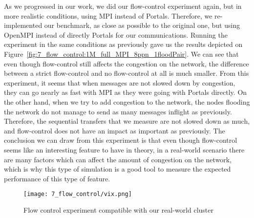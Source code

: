 As we progressed in our work, we did our flow-control experiment again, but in
more realistic conditions, using MPI instead of Portals. Therefore, we
re-implemented our benchmark, as close as possible to the original one, but
using OpenMPI instead of directly Portals for our communications. Running the
experiment in the same conditions as previously gave us the results depicted on
Figure~\ref{fig:7_flow_control:1M_full_MPI_8ppn_1floodPair}. We can see that
even though flow-control still affects the congestion on the network, the
difference between a strict flow-control and no flow-control at all is much
smaller. From this experiment, it seems that when messages are not slowed down
by congestion, they can go nearly as fast with MPI as they were going with
Portals directly. On the other hand, when we try to add congestion to the
network, the nodes flooding the network do not manage to send as many messages
inflight as previously. Therefore, the sequential transfers that we measure are
not slowed down as much, and flow-control does not have an impact as important
as previously. The conclusion we can draw from this experiment is that even
though flow-control seems like an interesting feature to have in theory, in a
real-world scenario there are many factors which can affect the amount of
congestion on the network, which is why this type of simulation is a good tool
to measure the expected performance of this type of feature.

\begin{figure}[!ht]
    \centering
    \texttt{[image: 7\_flow\_control/vix.png]}
    \caption{Flow control experiment compatible with our real-world cluster}
    \label{fig:7_flow_control:experiment_vix}
\end{figure}

